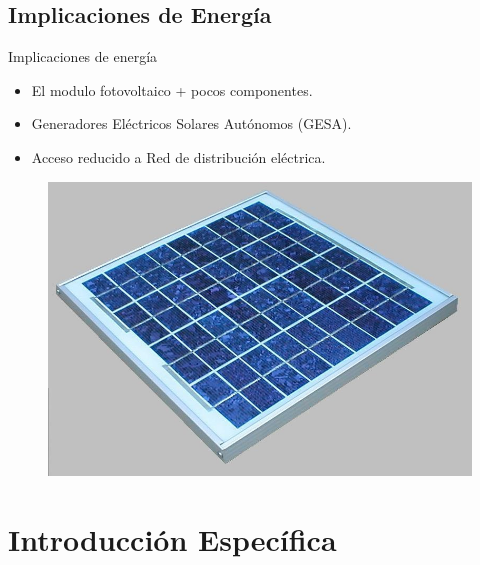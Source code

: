 \documentclass[aspectratio=169, handout]{beamer}
\begin{document}
\subsection[Energía]{Implicaciones de Energía}
\begin{frame}{Implicaciones de energía} 
\begin{minipage}[c]{1.0\linewidth}
	\begin{minipage}[c]{0.7\linewidth}
		\begin{itemize}
			\item El modulo fotovoltaico + pocos componentes.
					\vspace{10px}
			\item Generadores Eléctricos Solares Autónomos (GESA).
					\vspace{10px}
			\item Acceso reducido a Red de distribución eléctrica.
					\vspace{10px}
		\end{itemize}

\end{minipage}
	\begin{minipage}[c]{0.25\linewidth}
		\begin{figure}[H]			
		\includegraphics[width=1.2\textwidth]{./imagenes/ks10t.jpg}
		\end{figure}	  	  	
	\end{minipage}
\end{minipage}
\end{frame}
\section{Introducción Específica}
\end{document}
